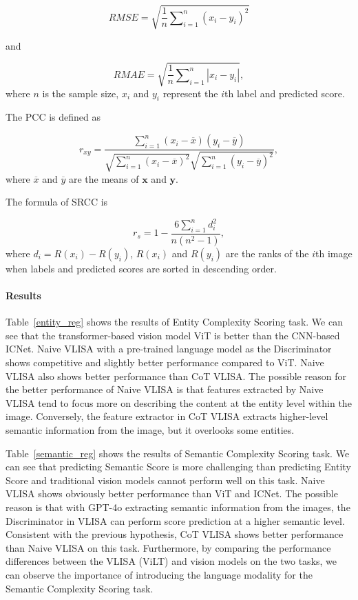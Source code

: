 \begin{equation}
RMSE = \sqrt{ \frac{1}{n} \sum\nolimits_{i=1}^{n} (x_i - y_i)^2 }
\end{equation}

and

\begin{equation}
RMAE = \sqrt{ \frac{1}{n} \sum\nolimits_{i=1}^{n} | x_i - y_i |},
\end{equation}
where $n$ is the sample size,  $x_i$ and $y_i$ represent the $i$th label and  predicted score. 

The PCC is defined as

\begin{equation}
r_{xy} = \frac{\displaystyle\sum\nolimits_{i=1}^{n}(x_i-\overline{x})(y_i-\overline{y})}{\sqrt{\displaystyle\sum\nolimits_{i=1}^{n}(x_i-\overline{x})^2}\sqrt{\displaystyle\sum\nolimits_{i=1}^{n}(y_i-\overline{y})^2}},
\end{equation}
where $\overline{x}$ and $\overline{y}$ are the means of $\mathbf{x}$ and $\mathbf{y}$.

The formula of SRCC is 

\begin{equation}
r_s = 1 - \frac{6 \sum_{i=1}^{n} d_i^2}{n(n^2 - 1)},
\end{equation}
where $d_i=R(x_i)-R(y_i)$, $R(x_i)$ and $R(y_i)$ are the ranks of the $i$th image when labels and predicted scores are sorted in descending order.

\paragraph{Results}





Table~\ref{entity_reg} shows the results of Entity Complexity Scoring task.
We can see that the transformer-based vision model ViT is better than the CNN-based ICNet.
Naive VLISA with a pre-trained language model as the Discriminator shows competitive and slightly better performance compared to ViT.
Naive VLISA also shows better performance than CoT VLISA.
The possible reason for the better performance of Naive VLISA is that features extracted by Naive VLISA tend to focus more on describing the content at the entity level within the image.
Conversely, the feature extractor in CoT VLISA extracts higher-level semantic information from the image, but it overlooks some entities.

Table~\ref{semantic_reg} shows the results of Semantic Complexity Scoring task.
We can see that predicting Semantic Score is more challenging than predicting Entity Score and traditional vision models cannot perform well on this task.
Naive VLISA shows obviously better performance than ViT and ICNet.
The possible reason is that with GPT-4o extracting semantic information from the images, the Discriminator in VLISA can perform score prediction at a higher semantic level.
Consistent with the previous hypothesis, CoT VLISA shows better performance than Naive VLISA on this task.
Furthermore, by comparing the performance differences between the VLISA (ViLT) and vision models on the two tasks, we can observe the importance of introducing the language modality for the Semantic Complexity Scoring task.

